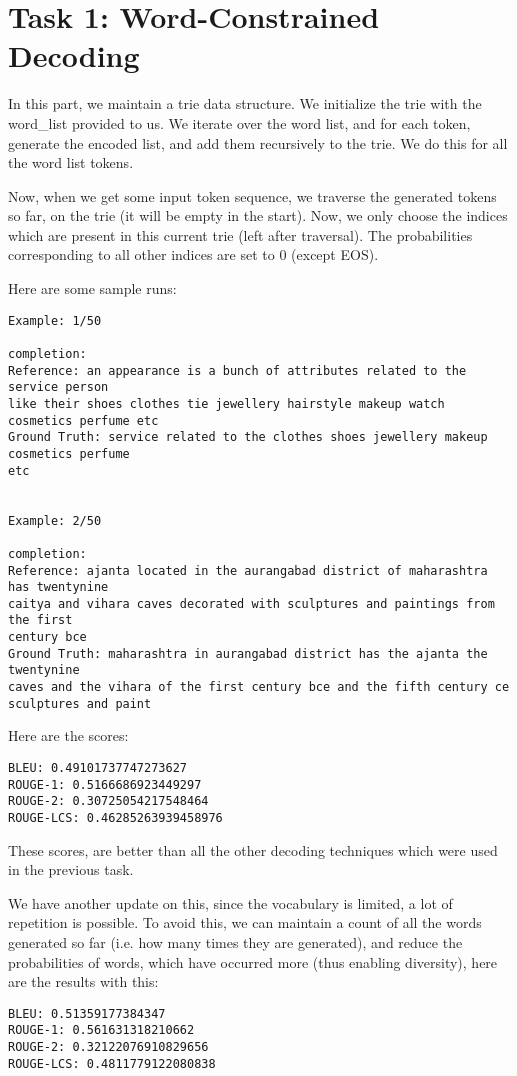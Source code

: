 \documentclass[a4paper,12pt]{article}
\begin{document}
\clearpage
\section{Task 1: Word-Constrained Decoding}
In this part, we maintain a trie data structure. We initialize the trie with the word\_list provided to us. We iterate over the word list, and for each token, generate the encoded list, and add them recursively to the trie. We do this for all the word list tokens.

Now, when we get some input token sequence, we traverse the generated tokens so far, on the trie (it will be empty in the start). Now, we only choose the indices which are present in this current trie (left after traversal). The probabilities corresponding to all other indices are set to 0 (except EOS).

Here are some sample runs:
\begin{verbatim}
Example: 1/50

completion:
Reference: an appearance is a bunch of attributes related to the service person 
like their shoes clothes tie jewellery hairstyle makeup watch cosmetics perfume etc
Ground Truth: service related to the clothes shoes jewellery makeup cosmetics perfume 
etc


Example: 2/50

completion:
Reference: ajanta located in the aurangabad district of maharashtra has twentynine 
caitya and vihara caves decorated with sculptures and paintings from the first
century bce
Ground Truth: maharashtra in aurangabad district has the ajanta the twentynine 
caves and the vihara of the first century bce and the fifth century ce 
sculptures and paint
\end{verbatim}


Here are the scores:

\begin{verbatim}
BLEU: 0.49101737747273627
ROUGE-1: 0.5166686923449297
ROUGE-2: 0.30725054217548464
ROUGE-LCS: 0.46285263939458976
\end{verbatim}


These scores, are better than all the other decoding techniques which were used in the previous task. 


We have another update on this, since the vocabulary is limited, a lot of repetition is possible. To avoid this, we can maintain a count of all the words generated so far (i.e. how many times they are generated), and reduce the probabilities of words, which have occurred more (thus enabling diversity), here are the results with this:

\begin{verbatim}
BLEU: 0.51359177384347
ROUGE-1: 0.561631318210662
ROUGE-2: 0.32122076910829656
ROUGE-LCS: 0.4811779122080838
\end{verbatim}
\end{document}

